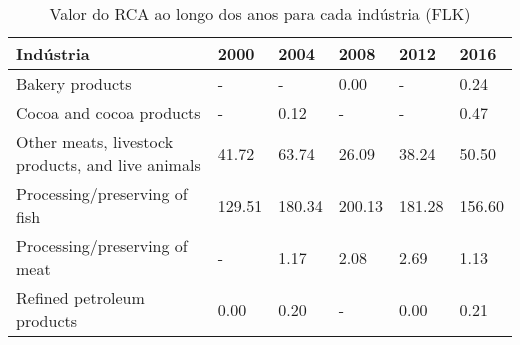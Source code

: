 \begin{table}
\centering
\caption{Valor do RCA ao longo dos anos para cada indústria (FLK)}
\label{tab:ex3-tempo-FLK}
\begin{tabular}{p{6cm}p{1.5cm}p{1.5cm}p{1.5cm}p{1.5cm}p{1.5cm}}
\toprule
                                        Indústria &   2000 &   2004 &   2008 &   2012 &   2016 \\
\midrule
                                  Bakery products &      - &      - &   0.00 &      - &   0.24 \\
                         Cocoa and cocoa products &      - &   0.12 &      - &      - &   0.47 \\
Other meats, livestock products, and live animals &  41.72 &  63.74 &  26.09 &  38.24 &  50.50 \\
                    Processing/preserving of fish & 129.51 & 180.34 & 200.13 & 181.28 & 156.60 \\
                    Processing/preserving of meat &      - &   1.17 &   2.08 &   2.69 &   1.13 \\
                       Refined petroleum products &   0.00 &   0.20 &      - &   0.00 &   0.21 \\
\bottomrule
\end{tabular}
\end{table}
